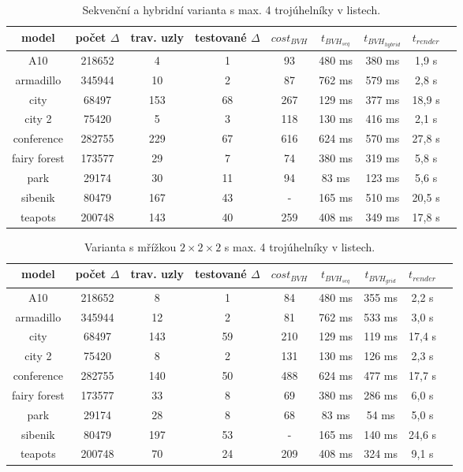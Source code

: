 \documentclass[11pt]{article}
\begin{document}
\begin{table}[h]
\begin{center}
\begin{tabular}{|c|c|c|c|c|c|c|c|c|}
\hline
model & počet $\Delta$ & trav. uzly & testované $\Delta$ & $cost_{BVH}$ & $t_{BVH_{seq}}$ & $t_{BVH_{hybrid}}$ & $t_{render}$\\
\hline
A10 & 218652 & 4 & 1 & 93 & 480 ms & 380 ms & 1,9 s\\
\hline
armadillo & 345944 & 10 & 2 & 87 & 762 ms & 579 ms & 2,8 s\\
\hline
city & 68497 & 153 & 68 & 267 & 129 ms & 377 ms & 18,9 s\\
\hline
city 2 & 75420 & 5 & 3 & 118 & 130 ms & 416 ms & 2,1 s\\
\hline
conference & 282755 & 229 & 67 & 616 & 624 ms & 570 ms & 27,8 s\\
\hline
fairy forest & 173577 & 29 & 7 & 74 & 380 ms & 319 ms & 5,8 s\\
\hline
park & 29174 & 30 & 11 & 94 & 83 ms & 123 ms & 5,6 s\\
\hline
sibenik & 80479 & 167 & 43 & - & 165 ms & 510 ms & 20,5 s\\
\hline
teapots & 200748 & 143 & 40 & 259 & 408 ms & 349 ms & 17,8 s\\
\hline
\end{tabular}
\end{center}
\caption{Sekvenční a hybridní varianta s max. 4 trojúhelníky v listech.}
\label{test4seq}
\end{table}

\begin{table}[h]
\begin{center}
\begin{tabular}{|c|c|c|c|c|c|c|c|c|}
\hline
model & počet $\Delta$ & trav. uzly & testované $\Delta$ & $cost_{BVH}$ & $t_{BVH_{seq}}$ & $t_{BVH_{grid}}$ & $t_{render}$\\
\hline
A10 & 218652 & 8 & 1 & 84 & 480 ms & 355 ms & 2,2 s\\
\hline
armadillo & 345944 & 12 & 2 & 81 & 762 ms & 533 ms & 3,0 s\\
\hline
city & 68497 & 143 & 59 & 210 & 129 ms & 119 ms & 17,4 s\\
\hline
city 2 & 75420 & 8 & 2 & 131 & 130 ms & 126 ms & 2,3 s\\
\hline
conference & 282755 & 140 & 50 & 488 & 624 ms & 477 ms & 17,7 s\\
\hline
fairy forest & 173577 & 33 & 8 & 69 & 380 ms & 286 ms & 6,0 s\\
\hline
park & 29174 & 28 & 8 & 68 & 83 ms & 54 ms & 5,0 s\\
\hline
sibenik & 80479 & 197 & 53 & - & 165 ms & 140 ms & 24,6 s\\
\hline
teapots & 200748 & 70 & 24 & 209 & 408 ms & 324 ms & 9,1 s\\
\hline
\end{tabular}
\end{center}
\caption{Varianta s mřížkou $2 \times 2 \times 2$ s max. 4 trojúhelníky v listech.}
\label{test4grid}
\end{table}
\end{document}
